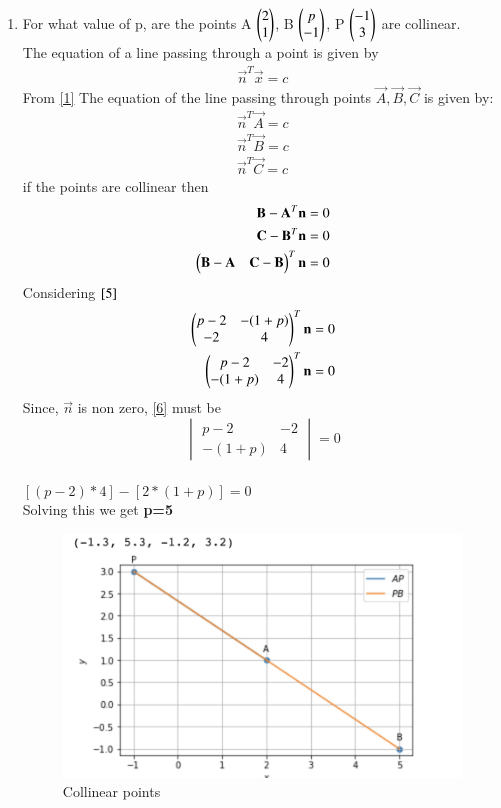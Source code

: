 \documentclass[journal,12pt,twocolumn]{IEEEtran}
\renewcommand\thesection{\arabic{section}}
\begin{document}
\begin{enumerate}[label=\thesection.\arabic*.,ref=\thesection.\theenumi]
\item For what value of p, are the points A $\begin{pmatrix}2\\1\end{pmatrix}$, B $\begin{pmatrix}p\\-1\end{pmatrix}$, P $\begin{pmatrix}-1\\3\end{pmatrix}$ are collinear. \\
\solution The equation of a line passing through a point is given by \begin{align}\vec{n}^T\vec{x}=c \label{1} \end{align}
From \eqref{1} The equation of the line passing through points $\vec{A}, \vec{B}, \vec{C}$ is given by:
\begin{align}
\vec{n}^T\vec{A}=c \label{2} \\
\vec{n}^T\vec{B}=c \label{3 }\\
\vec{n}^T\vec{C}=c \label{4} 
\end{align}
if the points are collinear then 
\begin{align}
\mathbf{B-A}^T\mathbf{n} = 0 \\
\mathbf{C-B}^T\mathbf{n} = 0 \\
\begin{pmatrix}\mathbf{B-A} & \mathbf{C-B}\end{pmatrix}^T\mathbf{n} = 0 \label{5}
\end{align}
Considering $\eqref{5}$
\begin{align}
\begin{pmatrix}p-2 & -(1+p) \\ -2 & 4\end{pmatrix}^T\mathbf{n} = 0 \nonumber \\
\begin{pmatrix}p-2 & -2 \\ -(1+p) & 4\end{pmatrix}^T\mathbf{n} = 0 \label{6}
\end{align}
Since, $\vec{n}$ is non zero, \eqref{6} must be 
\[
\begin{vmatrix}
p-2 & -2 \\ 
-(1+p) & 4
\end{vmatrix}
= 0
\] \\
$[(p-2)*4] - [2*(1+p)] = 0 $ \\
Solving this we get \textbf{p=5}

   \begin{figure}
	  \centering 
	  \includegraphics[width=\columnwidth]{3.7}
	  \caption{Collinear points}
	  \label{fig:geometry-3.9.pdf}
  \end{figure}


\end{enumerate}
\end{document}
